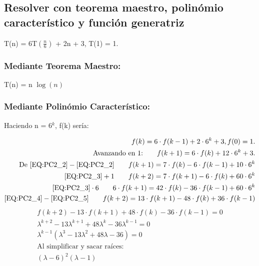 \documentclass[11pt]{utalcaDoc}
\numberwithin{equation}{section}
\begin{document}
\subsection{Resolver con teorema maestro, polinómio característico y función generatriz}
	\begin{center}
		T(n) = 6T$\left(\frac{n}{6}\right)$ + 2n + 3, T(1) = 1.
	\end{center}
	\subsubsection{Mediante Teorema Maestro:}
		\begin{center}
			T(n) = n $\log{}(n)$
		\end{center}
	\subsubsection{Mediante Polinómio Característico:}
		\begin{center}	
			Haciendo n = 6$^{k}$, f(k) sería:
		\end{center}
		\begin{eqnarray}
			\label{EQ:PC2_1}f(k) = 6 \cdot f(k-1) + 2 \cdot 6^{k} + 3, f(0) = 1.\\
			\label{EQ:PC2_2}\text{Avanzando en 1:}\qquad f(k+1) = 6 \cdot f(k) + 12 \cdot 6^{k} + 3.\\
			\label{EQ:PC2_3}\text{De } \ref{EQ:PC2_2} - \ref{EQ:PC2_2} \qquad f(k+1) = 7 \cdot f(k) - 6 \cdot f(k-1) + 10 \cdot 6^{k}\\
			\label{EQ:PC2_4}\ref{EQ:PC2_3}+1 \qquad f(k+2) = 7 \cdot f(k+1) - 6 \cdot f(k) + 60 \cdot 6^{k}\\
			\label{EQ:PC2_5}\ref{EQ:PC2_3}\cdot6 \qquad 6 \cdot f(k+1) = 42 \cdot f(k) - 36 \cdot f(k-1) + 60 \cdot 6^{k}\\
			\label{EQ:PC2_6}\ref{EQ:PC2_4} - \ref{EQ:PC2_5} \qquad f(k+2) = 13 \cdot f(k+1) - 48 \cdot f(k) + 36 \cdot f(k-1)
		\end{eqnarray}
		\begin{eqnarray*}
			f(k+2) - 13 \cdot f(k+1) + 48 \cdot f(k) - 36 \cdot f(k-1) = 0\\
			\lambda^{k+2} - 13 \lambda^{k+1} + 48 \lambda^{k} - 36 \lambda^{k-1} = 0\\
			\lambda^{k-1}(\lambda^3 - 13\lambda^2 + 48\lambda - 36) = 0\\
			\text{Al simplificar y sacar raíces:} \qquad\\
			(\lambda - 6)^2 (\lambda - 1)
		\end{eqnarray*}		
\end{document}
